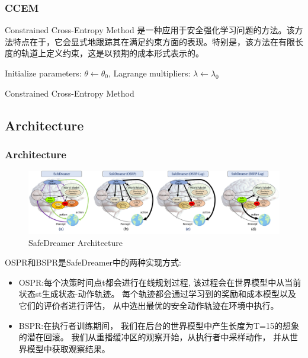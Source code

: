 \documentclass[10pt,mathserif]{beamer}%
\begin{document}
\begin{frame}[t, fragile]
	\frametitle{CCEM}
 Constrained Cross-Entropy Method 是一种应用于安全强化学习问题的方法。该方法特点在于，它会显式地跟踪其在满足约束方面的表现。特别是，该方法在有限长度的轨道上定义约束，这是以预期的成本形式表示的。
	\begin{algorithm}[H]
	\SetAlgoLined
	Initialize parameters: $\theta \leftarrow \theta_0$, Lagrange multipliers: $\lambda \leftarrow \lambda_0$\;
	\caption{Constrained Cross-Entropy Method}
	\end{algorithm}
	\end{frame}

\subsection{Architecture}
\begin{frame}[t, fragile]
	\frametitle{Architecture}
	\begin{figure}
		\centering
		\includegraphics[width=0.9\linewidth]{./images/brain.pdf}
		\caption{SafeDreamer Architecture}
		\label{Fig:net}
	\end{figure}
	\begin{spacing}{1.5}
		OSPR和BSPR是SafeDreamer中的两种实现方式:
		{
		\fontsize{10}\selectfont
		\begin{itemize}
			\item OSPR:每个决策时间点t都会进行在线规划过程,
			该过程会在世界模型中从当前状态st生成状态-动作轨迹。
			每个轨迹都会通过学习到的奖励和成本模型以及它们的评价者进行评估，
			从中选出最优的安全动作轨迹在环境中执行。
			\item BSPR:在执行者训练期间，
			我们在后台的世界模型中产生长度为T=15的想象的潜在回滚。
			我们从重播缓冲区的观察开始，从执行者中采样动作，
			并从世界模型中获取观察结果。
		\end{itemize}
		}	
	\end{spacing}
\end{frame}
\end{document}
